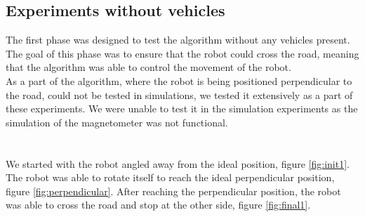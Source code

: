    \subsection{Experiments without vehicles}
        The first phase was designed to test the algorithm without any vehicles present. The goal of this phase was to ensure that the robot could cross the road, meaning that the algorithm was able to control the movement of the robot.\\
        As a part of the algorithm, where the robot is being positioned perpendicular to the road, could not be tested in simulations, we tested it extensively as a part of these experiments. We were unable to test it in the simulation experiments as the simulation of the magnetometer was not functional.\\\\
        \\
            We started with the robot angled away from the ideal position, figure \ref{fig:init1}. The robot was able to rotate itself to reach the ideal perpendicular position, figure \ref{fig:perpendicular}. After reaching the perpendicular position, the robot was able to cross the road and stop at the other side, figure \ref{fig:final1}.\\
